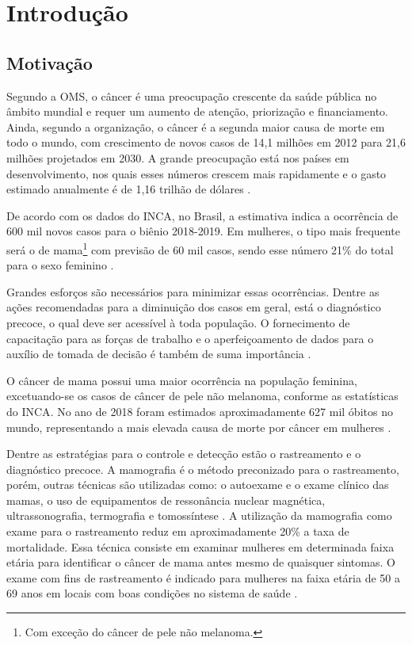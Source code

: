 \chapter[Introdução]{Introdução}\label{Introdução}


\section{Motivação}
Segundo a \ac{OMS}, o câncer é uma preocupação crescente da saúde pública no âmbito mundial e requer um aumento de atenção, priorização e financiamento. Ainda, segundo a organização, o câncer é a segunda maior causa de morte em todo o mundo, com crescimento de novos casos de 14,1 milhões em 2012 para 21,6 milhões projetados em 2030. A grande preocupação está nos países em desenvolvimento, nos quais esses números crescem mais rapidamente e o gasto estimado anualmente é de 1,16 trilhão de dólares \cite{oms}.

De acordo com os dados do \ac{INCA}, no Brasil, a estimativa indica a ocorrência de 600 mil novos casos para o biênio 2018-2019. Em mulheres, o tipo mais frequente será o de mama\footnote{Com exceção do câncer de pele não melanoma.} com previsão de 60 mil casos, sendo esse número 21\% do total para o sexo feminino \cite{inca}.

Grandes esforços são necessários para minimizar essas ocorrências. Dentre as ações recomendadas para a diminuição dos casos em geral, está o diagnóstico precoce, o qual deve ser acessível à toda população. O fornecimento de capacitação para as forças de trabalho e o aperfeiçoamento de dados para o auxílio de tomada de decisão é também de suma importância \cite{oms}. 

O câncer de mama possui uma maior ocorrência na população feminina, excetuando-se os casos de câncer de pele não melanoma, conforme as estatísticas do \ac{INCA}. No ano de 2018 foram estimados aproximadamente 627 mil óbitos no mundo, representando a mais elevada causa de morte por câncer em mulheres \cite{oms}.

Dentre as estratégias para o controle e detecção estão o rastreamento e o diagnóstico precoce. A mamografia é o método preconizado para o rastreamento, porém, outras técnicas são utilizadas como: o autoexame e o exame clínico das mamas, o uso de equipamentos de ressonância nuclear magnética, ultrassonografia, termografia e tomossíntese \cite{inca}. A utilização da mamografia como exame para o rastreamento reduz em aproximadamente 20\% a taxa de mortalidade. Essa técnica consiste em examinar mulheres em determinada faixa etária para identificar o câncer de mama antes mesmo de quaisquer sintomas. O exame com fins de rastreamento é indicado para mulheres na faixa etária de 50 a 69 anos em locais com boas condições no sistema de saúde \cite{oms}.

